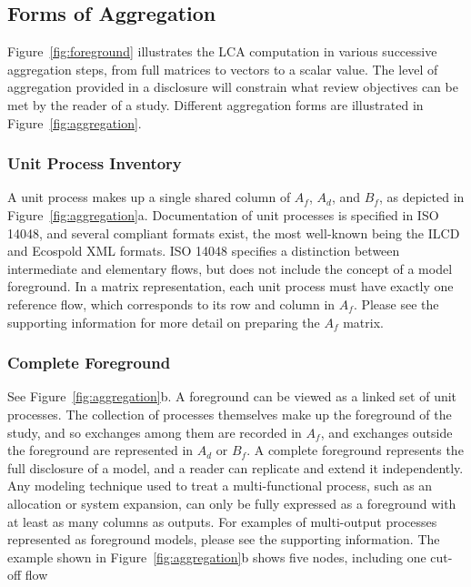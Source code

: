 \subsection{Forms of Aggregation}

Figure~\ref{fig:foreground} illustrates the LCA computation in various successive aggregation steps, from full matrices to vectors to a scalar value.  The level of aggregation provided in a disclosure will constrain what review objectives can be met by the reader of a study.  Different aggregation forms are illustrated in Figure~\ref{fig:aggregation}.

\subsubsection{Unit Process Inventory}

A unit process makes up a single shared column of $A_f$, $A_d$, and $B_f$, as depicted in Figure~\ref{fig:aggregation}a.  Documentation of unit processes is specified in ISO 14048, and several compliant formats exist, the most well-known being the ILCD and Ecospold XML formats.  ISO 14048 specifies a distinction between intermediate and elementary flows, but does not include the concept of a model foreground.  In a matrix representation, each unit process must have exactly one reference flow, which corresponds to its row and column in $A_f$.
Please see the supporting information for more detail on preparing the $A_f$ matrix.



\subsubsection{Complete Foreground}

See Figure~\ref{fig:aggregation}b.  A foreground can be viewed as a linked set of unit processes.  The collection of processes themselves make up the foreground of the study, and so exchanges among them are recorded in $A_f$, and exchanges outside the foreground are represented in $A_d$ or $B_f$.  A complete foreground represents
the full disclosure of a model, and a reader can replicate and extend it independently.
Any modeling technique used to treat a multi-functional process, such as an allocation or system expansion, can only be fully expressed as a foreground with at least as many columns as outputs.  For examples of multi-output processes represented as foreground models, please see the supporting information.  The example shown in Figure~\ref{fig:aggregation}b shows five nodes, including one cut-off flow


